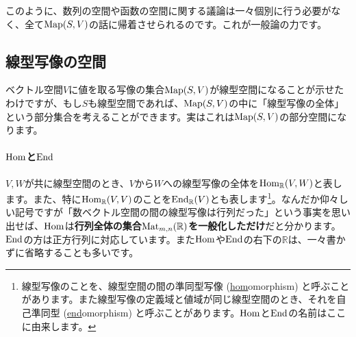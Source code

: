 このように、数列の空間や函数の空間に関する議論は一々個別に行う必要がなく、全て$\operatorname{Map}(S, V)$の話に帰着させられるのです。これが一般論の力です。

\subsection{線型写像の空間}

ベクトル空間$V$に値を取る写像の集合$\operatorname{Map}(S, V)$が線型空間になることが示せたわけですが、もし$S$も線型空間であれば、$\operatorname{Map}(S, V)$の中に「線型写像の全体」という部分集合を考えることができます。実はこれは$\operatorname{Map}(S, V)$の部分空間になります。

\paragraph{$\operatorname{Hom}$と$\operatorname{End}$}

$V, W$が共に線型空間のとき、$V$から$W$への線型写像の全体を$\operatorname{Hom}_{\mathbb{R}}(V, W)$と表します。また、特に$\operatorname{Hom}_{\mathbb{R}}(V, V)$のことを$\operatorname{End}_{\mathbb{R}}(V)$とも表します\footnote{線型写像のことを、線型空間の間の準同型写像 (\underline{hom}omorphism) と呼ぶことがあります。また線型写像の定義域と値域が同じ線型空間のとき、それを自己準同型 (\underline{end}omorphism) と呼ぶことがあります。$\operatorname{Hom}$と$\operatorname{End}$の名前はここに由来します。}。なんだか仰々しい記号ですが「数ベクトル空間の間の線型写像は行列だった」という事実を思い出せば、$\operatorname{Hom}$は\textbf{行列全体の集合$\operatorname{Mat}_{m,n}(\mathbb{R})$を一般化しただけ}だと分かります。$\operatorname{End}$の方は正方行列に対応しています。また$\operatorname{Hom}$や$\operatorname{End}$の右下の$\mathbb{R}$は、一々書かずに省略することも多いです。

